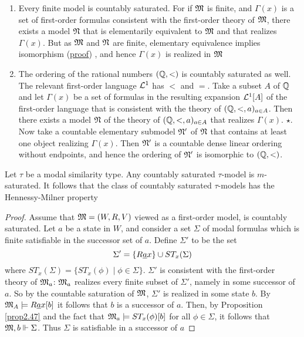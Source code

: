 \documentclass[11pt]{article}
\begin{document}
\begin{examplle}[]
\begin{enumerate}
\item Every finite model is countably saturated. For if \(\mathfrak{M}\) is finite, and
\(\Gamma(x)\) is a set of first-order formulas consistent with the first-order
theory of \(\mathfrak{M}\), there exists a model \(\mathfrak{N}\) that is elementarily
equivalent to \(\mathfrak{M}\) and that realizes \(\Gamma(x)\). But as \(\mathfrak{M}\) and
\(\mathfrak{N}\) are finite, elementary equivalence implies isomorphism
(\href{https://math.stackexchange.com/questions/1518629/a-simple-proof-that-elementary-equivalence-and-isomorphism-coincide-for-finite-s}{proof})
, and hence
\(\Gamma(x)\) is realized in \(\mathfrak{M}\)
\item The ordering of the rational numbers \((\mathbb{Q},<)\) is countably saturated as
well. The relevant first-order language \(\mathcal{L}^1\) has \(<\) and \(=\).
Take a subset \(A\) of \(\mathbb{Q}\) and let \(\Gamma(x)\) be a set of formulas in the
resulting expansion \(\mathcal{L}^1[A]\) of the first-order language that is
consistent with the theory of \((\mathbb{Q},<,a)_{a\in A}\). Then there exists a
model \(\mathfrak{N}\) of the theory of \((\mathbb{Q},<,a)_{a\in A}\) that realizes
\(\Gamma(x)\). \(\star\).
Now take a countable elementary submodel \(\mathfrak{N}'\) of \(\mathfrak{N}\) that
contains at least one object realizing \(\Gamma(x)\). Then \(\mathfrak{N}'\) is a
countable dense linear ordering without endpoints, and hence the ordering
of \(\mathfrak{N}'\) is isomorphic to \((\mathbb{Q},<)\).
\end{enumerate}
\end{examplle}

\begin{theorem}[]
\label{thm2.65}
Let \(\tau\) be a modal similarity type. Any countably saturated \(\tau\)-model is
\(m\)-saturated. It follows that the class of countably saturated
\(\tau\)-models has the Hennessy-Milner property
\end{theorem}

\begin{proof}
Assume that \(\mathfrak{M}=(W,R,V)\) viewed as a first-order model, is countably
saturated. Let \(a\) be a state in \(W\), and consider a set \(\Sigma\) of modal
formulas which is finite satisfiable in the successor set of \(a\). Define
\(\Sigma'\) to be the set
\begin{equation*}
\Sigma'=\{R\underline{a}x\}\cup ST_x(\Sigma)
\end{equation*}
where \(ST_x(\Sigma)=\{ST_x(\phi)\mid\phi\in\Sigma\}\). \(\Sigma'\) is consistent
with the first-order theory of \(\mathfrak{M}_a\): \(\mathfrak{M}_a\) realizes every finite
subset of \(\Sigma'\), namely in some successor of \(a\). So by the
countable saturation of \(\mathfrak{M}\), \(\Sigma'\) is realized in some state
\(b\). By \(\mathfrak{M}_A\models R\underline{a}x[b]\) it follows that \(b\) is a successor
of \(a\). Then, by Proposition \ref{prop2.47} and the fact that \(\mathfrak{M}_a\models
    ST_x(\phi)[b]\) for all \(\phi\in\Sigma\), it follows that
\(\mathfrak{M},b\Vdash\Sigma\). Thus \(\Sigma\) is satisfiable in a successor of \(a\)
\end{proof}
\end{document}
